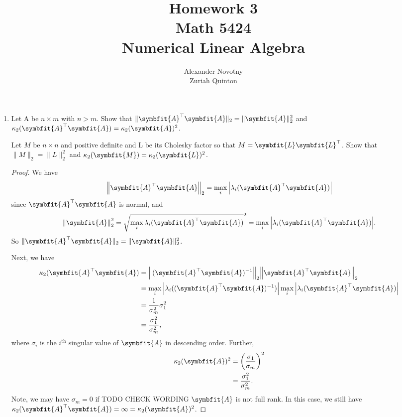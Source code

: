 \documentclass{article}
\title{Homework 3\\{\large Math 5424}\\{\large Numerical Linear Algebra}}
\author{Alexander Novotny\\Zuriah Quinton}
\theoremstyle{definition}
\newcommand{\mat}[1]{\symbfit{#1}}
\begin{document}
\maketitle

\begin{enumerate}[leftmargin=\labelsep]
	\item Let A be \(n \times m\) with \(n > m\). Show that \(\|\mat{A}^\top\mat{A}\|_2 = \|\mat{A}\|_2^2\) and \(\kappa_2 (\mat{A}^\top\mat{A}) = \kappa_2 (\mat{A})^2\).

	      Let \(M\) be \(n \times n\) and positive definite and L be its Cholesky factor so that \(M = \mat{L}\mat{L}^\top\). Show that \(\|M\|_2 = \|L\|_2^2\) and \(\kappa_2(\mat{M}) = \kappa_2(\mat{L})^2\).
	      \begin{proof}
		      We have
		      \begin{equation*}
			      \norm{\mat{A}^\top \mat{A}}_2 = \max_i \abs{ \lambda_i(\mat{A}^\top \mat{A}) } %
		      \end{equation*}
		      since \(\mat{A}^\top \mat{A}\) is normal, and
		      \begin{equation*}
			      \norm{\mat{A}}^2_2 = \sqrt{ \max_i \lambda_i(\mat{A}^\top \mat{A}) } ^2= \max_i \abs{ \lambda_i(\mat{A}^\top \mat{A}) }.
		      \end{equation*}
		      So \(\|\mat{A}^\top\mat{A}\|_2 = \|\mat{A}\|_2^2\).

		      Next, we have
		      \begin{align*}
			      \kappa_2(\mat{A}^\top \mat{A}) & = \norm{(\mat{A}^\top \mat{A})^{-1}}_2 \norm{\mat{A}^\top \mat{A}}_2                                   \\
			                                     & = \max_i \abs{ \lambda_i((\mat{A}^\top \mat{A})^{-1} )} \max_i \abs{ \lambda_i(\mat{A}^\top \mat{A}) } \\
			                                     & = \frac{1}{\sigma_m^2} \sigma_1^2                                                                      \\
			                                     & = \frac{\sigma_1^2}{\sigma_m^2},
		      \end{align*}
		      where \(\sigma_i\) is the \(i^{\text{th}}\) singular value of \(\mat{A}\) in descending order. Further,
		      \begin{align*}
			      \kappa_2(\mat{A})^2 & = \qty(\frac{\sigma_1}{\sigma_m})^2 \\
			                          & = \frac{\sigma_1^2}{\sigma_m^2}.
		      \end{align*}
		      Note, we may have \(\sigma_m=0\) if TODO CHECK WORDING \(\mat{A}\) is not full rank. In this case, we still have \(\kappa_2(\mat{A}^\top \mat{A})=\infty=\kappa_2(\mat{A})^2\).


\end{proof}
\end{enumerate}
\end{document}
